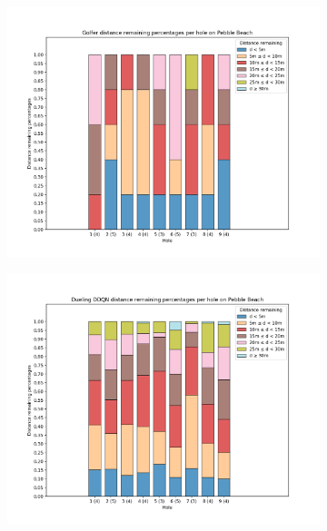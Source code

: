 \documentclass{kththesis}
\begin{document}
\begin{figure}
{\begin{subfigure}{0.3\paperwidth}
    \includegraphics[width=0.3\paperwidth]{L2Percentages/L2_Distance_Percentages_Pebble.png} 
    \end{subfigure}
    \begin{subfigure}{0.3\paperwidth}
    \centering
    \includegraphics[width=0.3\paperwidth]{AgentPercentages/DDDQN_Distance_Percentages_Pebble.png} 
    \end{subfigure}
    \begin{subfigure}{0.3\paperwidth}
    \centering

\end{subfigure}}
\end{figure}
\end{document}
